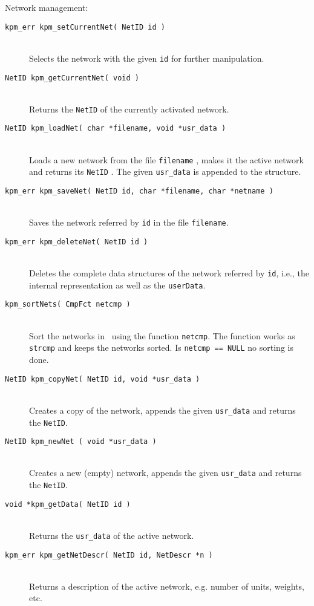 Network management:
\begin{description}

  \item[\tt kpm\_err kpm\_setCurrentNet( NetID id )]~\\
    Selects the network with the given \verb+id+ for further manipulation.
	
  \item[\tt NetID   kpm\_getCurrentNet( void )]~\\
    Returns the \verb+NetID+ of the currently activated network.

  \item[\tt NetID   kpm\_loadNet( char *filename, void *usr\_data )]~\\
    Loads a new network from the file \verb+filename+ , makes it the active network
and returns its \verb+NetID+ . The given \verb+usr_data+ is appended to the structure.


  \item[\tt kpm\_err kpm\_saveNet( NetID id, char *filename, char *netname )]~\\
	Saves the network referred by \verb+id+ in the file \verb+filename+.

  \item[\tt kpm\_err kpm\_deleteNet( NetID id )]~\\
	Deletes the complete data structures of the network referred by \verb+id+,
	i.e., the internal representation as well as the  \verb+userData+.
        

  \item[\tt kpm\_sortNets( CmpFct netcmp )] ~\\
	Sort the networks in \nepomuk\ using the function \verb+netcmp+.
	The function works as \verb+strcmp+ and keeps the
        networks sorted. Is \verb+netcmp == NULL+ no sorting is done.

  \item[\tt NetID   kpm\_copyNet( NetID id, void *usr\_data )]~\\
	Creates a copy of the network, appends the given  \verb+usr_data+
 	and returns the \verb+NetID+.

  \item[\tt NetID   kpm\_newNet ( void *usr\_data )]~\\
	Creates a new (empty) network, appends the given  \verb+usr_data+
 	and returns the \verb+NetID+.
	
  \item[\tt void   *kpm\_getData( NetID id )]~\\
	Returns the \verb+usr_data+ of the active network.


  \item[\tt kpm\_err kpm\_getNetDescr( NetID id, NetDescr *n )]~\\
	Returns a description of the active network, e.g. number of units,
	weights, etc.

\end{description}

